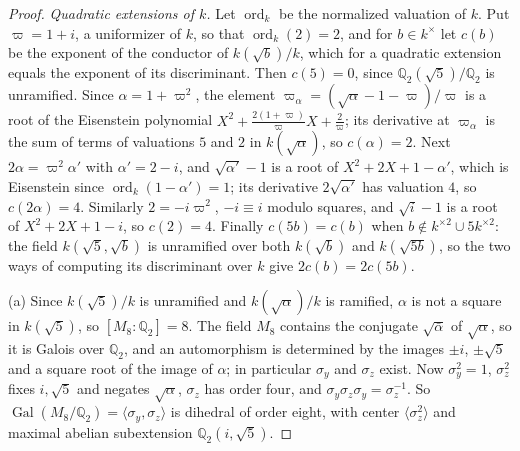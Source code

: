 \documentclass[11pt]{amsart}
\numberwithin{equation}{section}
\theoremstyle{definition}
\theoremstyle{remark}
\DeclareMathOperator{\Gal}{Gal}
\newcommand{\Q}{\mathbb Q}
\begin{document}
\begin{proof}
\emph{Quadratic extensions of $k$.} Let $\operatorname{ord}_k$ be the
normalized valuation of $k$. Put $\varpi=1+i$, a uniformizer of $k$,
so that $\operatorname{ord}_k(2)=2$, and for $b\in k^\times$ let $c(b)$ be the exponent of the
conductor of $k(\sqrt b)/k$, which for a quadratic extension equals the
exponent of its discriminant. Then $c(5)=0$, since $\Q_2(\sqrt5)/\Q_2$ is
unramified. Since $\alpha=1+\varpi^2$, the element
$\varpi_\alpha=(\sqrt\alpha-1-\varpi)/\varpi$ is a root of the Eisenstein
polynomial $X^2+\frac{2(1+\varpi)}\varpi X+\frac2\varpi$; its derivative at
$\varpi_\alpha$ is the sum of terms of valuations $5$ and $2$ in
$k(\sqrt\alpha)$, so $c(\alpha)=2$. Next $2\alpha=\varpi^2\alpha'$ with
$\alpha'=2-i$, and $\sqrt{\alpha'}-1$ is a root of $X^2+2X+1-\alpha'$, which
is Eisenstein since $\operatorname{ord}_k(1-\alpha')=1$; its derivative $2\sqrt{\alpha'}$ has
valuation $4$, so $c(2\alpha)=4$. Similarly $2=-i\varpi^2$, $-i\equiv i$
modulo squares, and $\sqrt i-1$ is a root of $X^2+2X+1-i$, so $c(2)=4$.
Finally $c(5b)=c(b)$ when $b\notin k^{\times2}\cup5k^{\times2}$: the field
$k(\sqrt5,\sqrt b)$ is unramified over both $k(\sqrt b)$ and $k(\sqrt{5b})$,
so the two ways of computing its discriminant over $k$ give $2c(b)=2c(5b)$.

(a) Since $k(\sqrt5)/k$ is unramified and $k(\sqrt\alpha)/k$ is ramified,
$\alpha$ is not a square in $k(\sqrt5)$, so $[M_8:\Q_2]=8$. The field $M_8$
contains the conjugate $\sqrt{\bar\alpha}$ of $\sqrt\alpha$, so it is Galois
over $\Q_2$, and an automorphism is determined by the images $\pm i$,
$\pm\sqrt5$ and a square root of the image of $\alpha$; in particular
$\sigma_y$ and $\sigma_z$ exist. Now $\sigma_y^2=1$, $\sigma_z^2$ fixes
$i,\sqrt5$ and negates $\sqrt\alpha$, $\sigma_z$ has order four, and
$\sigma_y\sigma_z\sigma_y=\sigma_z^{-1}$. So
$\Gal(M_8/\Q_2)=\langle\sigma_y,\sigma_z\rangle$ is dihedral of order eight,
with center $\langle\sigma_z^2\rangle$ and maximal abelian subextension
$\Q_2(i,\sqrt5)$.


\end{proof}
\end{document}
